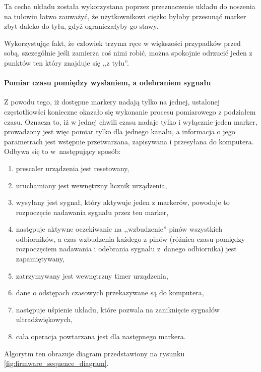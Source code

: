 Ta cecha układu została wykorzystana poprzez przeznaczenie układu do noszenia na tułowiu \ppauza łatwo zauważyć, że użytkownikowi ciężko byłoby przesunąć marker zbyt daleko do tyłu, gdyż ograniczałyby go stawy. 

Wykorzystując fakt, że człowiek trzyma ręce w większości przypadków przed sobą, szczególnie jeśli zamierza coś nimi robić, można spokojnie odrzucić jeden z punktów \ppauza ten który znajduje się ,,z tyłu''.

\paragraph{Pomiar czasu pomiędzy wysłaniem, a odebraniem sygnału}
\label{sec:uc_algorithm}
Z powodu tego, iż dostępne markery nadają tylko na jednej, ustalonej częstotliowści konieczne okazało się wykonanie procesu pomiarowego z podziałem czasu. Oznacza to, iż w jednej chwili czasu nadaje tylko i wyłącznie jeden marker, prowadzony jest więc pomiar tylko dla jednego kanału, a informacja o jego parametrach jest wstępnie przetwarzana, zapisywana i przesyłana do komputera. Odbywa się to w~następujący sposób:
\begin{enumerate}
 \item {}prescaler urządzenia jest resetowany,\label{enum:prescaler}
 \item uruchamiany jest wewnętrzny licznik urządzenia,
 \item wysyłany jest sygnał, który aktywuje jeden z markerów, powoduje to rozpoczęcie nadawania sygnału przez ten marker,
 \item następuje aktywne oczekiwanie na ,,wzbudzenie'' pinów wszystkich odbiorników, a czas wzbudzenia każdego z pinów (różnica czasu pomiędzy rozpoczęciem nadawania i odebrania sygnału z~danego odbiornika) jest zapamiętywany,
 \item zatrzymywany jest wewnętrzny timer urządzenia,
 \item dane o odstępach czasowych przekazywane są do komputera,
 \item następuje uśpienie układu, które pozwala na zaniknięcie sygnałów ultradźwiękowych,
 \item cała operacja powtarzana jest dla następnego markera.
\end{enumerate}
Algorytm ten obrazuje diagram przedstawiony na rysunku \ref{fig:firmware_sequence_diagram}.

